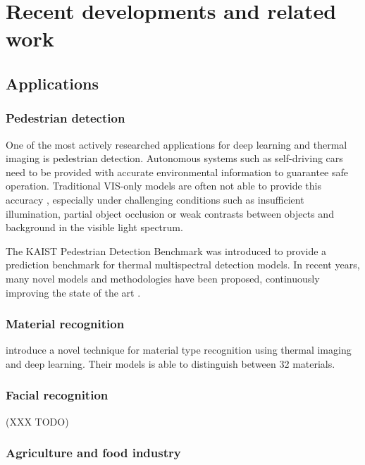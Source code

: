 \documentclass{l4proj}
\begin{document}

\section{Recent developments and related work}

\subsection{Applications}

\subsubsection{Pedestrian detection}

One of the most actively researched applications for deep learning and thermal imaging is pedestrian detection. Autonomous systems such as self-driving cars need to be provided with accurate environmental information to guarantee safe operation. Traditional VIS-only models are often not able to provide this accuracy \citep{zhang_how_2016}, especially under challenging conditions such as insufficient illumination, partial object occlusion or weak contrasts between objects and background in the visible light spectrum. 

The KAIST Pedestrian Detection Benchmark \citep{hwang_multispectral_2015} was introduced to provide a prediction benchmark for thermal multispectral detection models. In recent years, many novel models and methodologies have been proposed, continuously improving the state of the art \citep{konig_fully_2017}.

\subsubsection{Material recognition}

\citet{cho_deep_2018} introduce a novel technique for material type recognition using thermal imaging and deep learning. Their models is able to distinguish between 32 materials.

\subsubsection{Facial recognition}

(XXX TODO)
\citep{choi_thermal_2012}
\citep{sarfraz_deep_2017}

\subsubsection{Agriculture and food industry}
\end{document}
